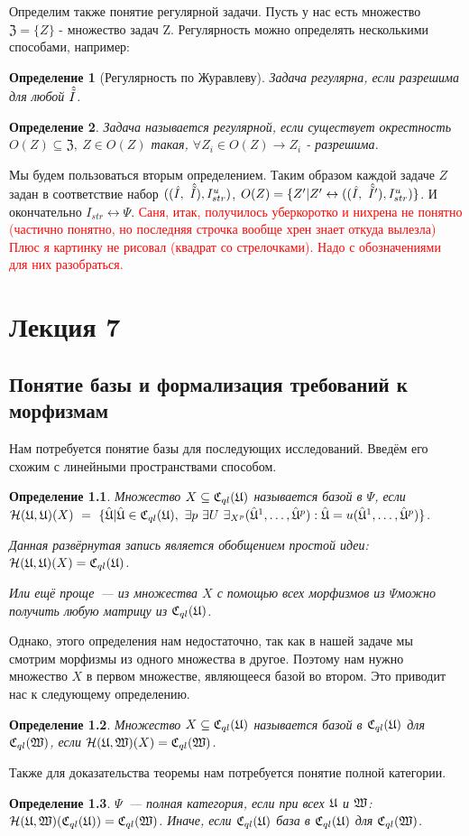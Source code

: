 \documentclass[a4paper, 12pt]{report}
\newtheorem{definition}{Определение}[chapter]
\begin{document}
Определим также понятие регулярной задачи. Пусть у нас есть множество $\mathfrak{Z}=\{Z\}$ - множество задач Z. Регулярность можно определять несколькими способами, например:
\begin{definition}[Регулярность по Журавлеву]
Задача регулярна, если разрешима для любой $\hat{\tilde{I}}$.
\end{definition}
\begin{definition}
Задача называется регулярной, если существует окрестность $O(Z)\subseteq \mathfrak{Z},\ Z\in O(Z)$ такая, $\forall Z_i\in O(Z) \rightarrow Z_i$ - разрешима.
\end{definition}
Мы будем пользоваться вторым определением.
Таким образом каждой задаче $Z$ задан в соответствие набор $((\hat{I},\ \hat{\tilde{I}}), I_{str}^u)$, $O(Z) = \{Z'| Z' \leftrightarrow ((\hat{I},\ \hat{\tilde{I}}'), I_{str}^u)\}$.
И окончательно $I_{str} \leftrightarrow \Psi$.
\textcolor{red}{Саня, итак, получилось уберкоротко и нихрена не понятно (частично понятно, но последняя строчка вообще хрен знает откуда вылезла) Плюс я картинку не рисовал (квадрат со стрелочками). Надо с обозначениями для них разобраться.}

\chapter{Лекция 7}
\section{Понятие базы и формализация требований к морфизмам}
Нам потребуется понятие базы для последующих исследований. Введём его схожим с линейными пространствами способом.
\begin{definition}
Множество $X\subseteq \mathfrak{C}_{ql}(\mathfrak{U})$ называется базой в $\Psi$, если $\mathcal{H}(\mathfrak{U},\mathfrak{U})(X)\ =\ \{\hat{\mathfrak{U}}| \hat{\mathfrak{U}} \in \mathfrak{C}_{ql}(\mathfrak{U}),\ \exists p\ \exists U\ \exists_{X^p} (\hat{\mathfrak{U}}^1,\ldots,\hat{\mathfrak{U}}^p): \hat{\mathfrak{U}} = u(\hat{\mathfrak{U}}^1,\ldots,\hat{\mathfrak{U}}^p)\}$.

Данная развёрнутая запись является обобщением простой идеи:  $\mathcal{H}(\mathfrak{U},\mathfrak{U})(X) = \mathfrak{C}_{ql}(\mathfrak{U})$.

Или ещё проще~--- из множества $X$ с помощью всех морфизмов из $\Psi $можно получить любую матрицу из $\mathfrak{C}_{ql}(\mathfrak{U})$.
\end{definition}
Однако, этого определения нам недостаточно, так как в нашей задаче мы смотрим морфизмы из одного множества в другое. Поэтому нам нужно множество $X$ в первом множестве, являющееся базой во втором. Это приводит нас к следующему определению.
\begin{definition}
Множество $X\subseteq \mathfrak{C}_{ql}(\mathfrak{U})$ называется базой в $\mathfrak{C}_{ql}(\mathfrak{U})$ для $\mathfrak{C}_{ql}(\mathfrak{W})$, если $\mathcal{H}(\mathfrak{U},\mathfrak{W})(X) = \mathfrak{C}_{ql}(\mathfrak{W})$.
\end{definition}
Также для доказательства теоремы нам потребуется понятие полной категории.
\begin{definition}
$\Psi$~--- полная категория, если при всех $\mathfrak{U}$ и  $\mathfrak{W}$: $\mathcal{H}(\mathfrak{U},\mathfrak{W})(\mathfrak{C}_{ql}(\mathfrak{U})) = \mathfrak{C}_{ql}(\mathfrak{W})$. Иначе, если $\mathfrak{C}_{ql}(\mathfrak{U})$ база в $\mathfrak{C}_{ql}(\mathfrak{U})$ для $\mathfrak{C}_{ql}(\mathfrak{W})$.
\end{definition}
\end{document}

